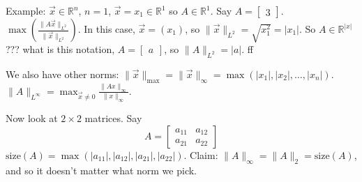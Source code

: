 \documentclass{article}
\theoremstyle{plain}
\theoremstyle{remark}
\newcommand{\R}{{\mathbb R}}
\begin{document}
Example: $\vec{x} \in \R^n$, $n = 1$, $\vec{x} = x_1 \in \R^1$ so $A \in \R^1$.
Say $A = \begin{bmatrix} 3 \end{bmatrix}$.
$\max\left(\frac{\lVert A\vec{x} \rVert_{L^2}}{\lVert \vec{x} \rVert_{L^2}}\right)$.
In this case, $\vec{x} = (x_1)$, so $\lVert \vec{x} \rVert_{L^2} = \sqrt{x_1^2} = |x_1|$.
So $A \in \R^{|x|}$ ??? what is this notation, $A = \begin{bmatrix} a \end{bmatrix}$,
so $\lVert A \rVert_{L^2} = |a|$.
ff

We also have other norms: $\lVert \vec{x} \rVert_{\mathrm{max}}
= \lVert \vec{x} \rVert_\infty = \max(|x_1|,|x_2|,\dots,|x_n|)$.
$\lVert A \rVert_{L^\infty} = \max_{\vec{x} \neq 0}\frac{\lVert Ax\rVert_\infty}
{\lVert x \rVert_\infty}$.

Now look at $2 \times 2$ matrices. Say
\[
	A = \begin{bmatrix} a_{11} & a_{12}\\ a_{21} & a_{22} \end{bmatrix}
\]
$\mathrm{size}(A) = \max(|a_{11}|, |a_{12}|, |a_{21}|, |a_{22}|)$.
Claim: $\lVert A \rVert_\infty = \lVert A \rVert_2 = \mathrm{size}(A)$,
and so it doesn't matter what norm we pick.
\end{document}

